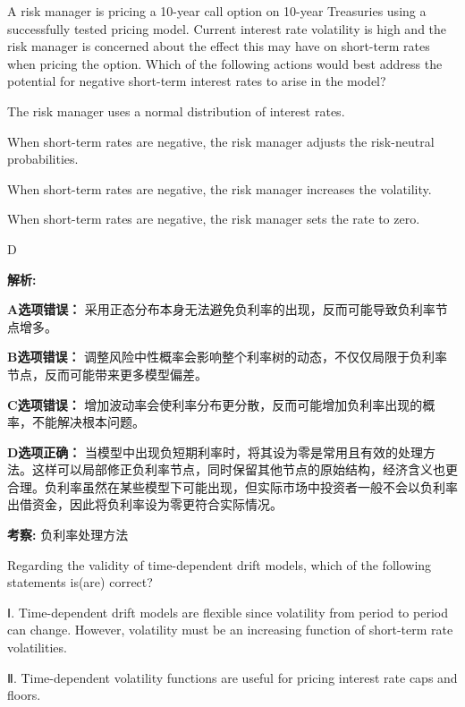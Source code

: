 \documentclass{article}
\newcounter{question} %
\newenvironment{explanation}
{\textbf{解析:}\par}
{\par}
\newcommand{\checklist}[1]{
    \textbf{考察:} #1 \par %
    \addcontentsline{toc}{subsection}{题号\thequestion 考察: #1} %
    \vspace{2em} %
}
\begin{document}
\begin{question}
    A risk manager is pricing a 10-year call option on 10-year Treasuries using a successfully tested pricing model. Current interest rate volatility is high and the risk manager is concerned about the effect this may have on short-term rates when pricing the option. Which of the following actions would best address the potential for negative short-term interest rates to arise in the model?
\end{question}

\begin{choices}
    \item The risk manager uses a normal distribution of interest rates.
    \item When short-term rates are negative, the risk manager adjusts the risk-neutral probabilities.
    \item When short-term rates are negative, the risk manager increases the volatility.
    \item When short-term rates are negative, the risk manager sets the rate to zero.
\end{choices}

\begin{correctanswer}
    D
\end{correctanswer}

\begin{explanation}
    \textbf{A选项错误：} 采用正态分布本身无法避免负利率的出现，反而可能导致负利率节点增多。

    \textbf{B选项错误：} 调整风险中性概率会影响整个利率树的动态，不仅仅局限于负利率节点，反而可能带来更多模型偏差。

    \textbf{C选项错误：} 增加波动率会使利率分布更分散，反而可能增加负利率出现的概率，不能解决根本问题。

    \textbf{D选项正确：} 当模型中出现负短期利率时，将其设为零是常用且有效的处理方法。这样可以局部修正负利率节点，同时保留其他节点的原始结构，经济含义也更合理。负利率虽然在某些模型下可能出现，但实际市场中投资者一般不会以负利率出借资金，因此将负利率设为零更符合实际情况。
\end{explanation}
\checklist{负利率处理方法}


\begin{question}
    Regarding the validity of time-dependent drift models, which of the following statements is(are) correct? 

    Ⅰ. Time-dependent drift models are flexible since volatility from period to period can change. However, volatility must be an increasing function of short-term rate volatilities. 

    Ⅱ. Time-dependent volatility functions are useful for pricing interest rate caps and floors.
\end{question}
\end{document}
